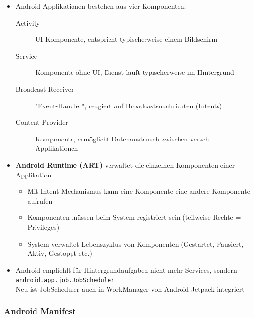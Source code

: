 \documentclass[a4paper]{article}
\begin{document}
		\begin{itemize}
			\item Android-Applikationen bestehen aus vier Komponenten:
			\begin{description}
				\item[Activity] UI-Komponente, entspricht typischerweise einem Bildschirm
				\item[Service] Komponente ohne UI, Dienst läuft typischerweise im Hintergrund
				\item[Broadcast Receiver] "Event-Handler", reagiert auf Broadcastsnachrichten (Intents)
				\item[Content Provider] Komponente, ermöglicht Datenaustausch zwischen versch. Applikationen
			\end{description}
			\item \textbf{Android Runtime (ART)} verwaltet die einzelnen Komponenten einer Applikation
			\begin{itemize}
				\item Mit Intent-Mechanismus kann eine Komponente eine andere Komponente aufrufen
				\item Komponenten müssen beim System registriert sein (teilweise Rechte = Privileges)
				\item System verwaltet Lebenszyklus von Komponenten (Gestartet, Pausiert, Aktiv, Gestoppt etc.)
			\end{itemize}
			\item Android empfiehlt für Hintergrundaufgaben nicht mehr Services, sondern \texttt{android.app.job.JobScheduler}\\
			Neu ist JobScheduler auch in WorkManager von Android Jetpack integriert
		\end{itemize}
	
			\subsubsection{Android Manifest}
			
\end{document}
